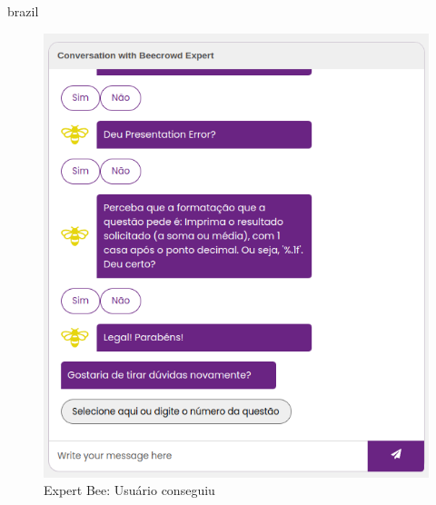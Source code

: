\begin{otherlanguage*}{brazil}
\begin{figure}[H]
    \centering
            \caption{Expert Bee: Usuário conseguiu}
            \label{fig:ModeloConceitual}
        \includegraphics[scale=0.63]{pictures/desenvolvimento/expert_bee_final_deu_certo.png}
\end{figure}


\end{otherlanguage*}
